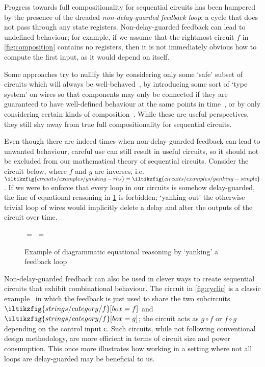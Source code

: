 Progress towards full compositionality for sequential circuits has been hampered
by the presence of the dreaded \emph{non-delay-guarded feedback loop}; a cycle
that does not pass through any state registers.
Non-delay-guarded feedback can lead to undefined behaviour; for example, if we
assume that the rightmost circuit \(f\) in \cref{fig:composition} contains no
registers, then it is not immediately obvious how to compute the first input, as
it would depend on itself.

Some approaches try to nullify this by considering only some `safe' subset of
circuits which will always be well-behaved~\cite{christensen2021wire}, by
introducing some sort of `type system' on wires so that components may only be
connected if they are guaranteed to have well-defined behaviour at the same
points in time~\cite{nigam2023modular}, or by only considering certain kinds of
composition~\cite{alekseyev2014compositional}.
While these are useful perspectives, they still shy away from true full
compositionality for sequential circuits.

Even though there are indeed times when non-delay-guarded feedback can lead to
unwanted behaviour, careful use can still result in useful circuits, so it
should not be excluded from our mathematical theory of sequential circuits.
Consider the circuit below, where \(f\) and \(g\) are inverses, i.e.\
\(
\iltikzfig{circuits/examples/yanking-rhs}
=
\iltikzfig{circuits/examples/yanking-simple}
\).
If we were to enforce that every loop in our circuits is
somehow delay-guarded, the line of equational reasoning in \cref{fig:yanking}
is forbidden; `yanking out' the otherwise trivial loop of wires would implicitly
delete a delay and alter the outputs of the circuit over time.
\begin{figure}
    \centering
    \(=\)
    \(=\)
    \caption{
        Example of diagrammatic equational reasoning by `yanking' a feedback
        loop
    }
    \label{fig:yanking}
\end{figure}

Non-delay-guarded feedback can also be used in clever ways to create sequential
circuits that exhibit combinational behaviour.
The circuit in \cref{fig:cyclic} is a classic example~\cite{malik1994analysis}
in which the feedback is just used to share the two subcircuits \(
\iltikzfig{strings/category/f}[box=f]
\) and \(
\iltikzfig{strings/category/f}[box=g]
\); the circuit acts as \(g \circ f\) or
\(f \circ g\) depending on the control input \(\mathsf{c}\).
Such circuits, while not following conventional design methodology, are more
efficient in terms of circuit size and power consumption.
This once more illustrates how working in a setting where not all loops are
delay-guarded may be beneficial to us.

